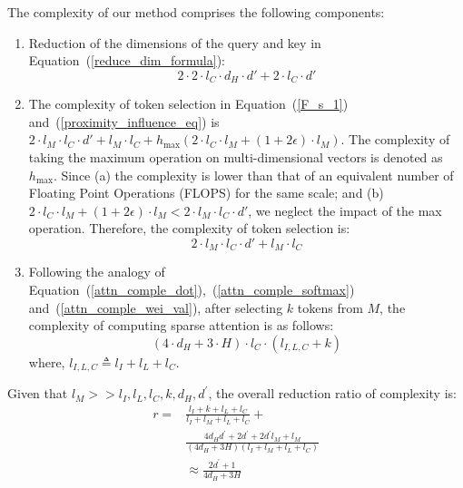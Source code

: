 The complexity of our method comprises the following components:
\begin{enumerate}
    \item Reduction of the dimensions of the query and key in Equation~(\ref{reduce_dim_formula}):
    \begin{equation}
      2 \cdot 2 \cdot l_C \cdot d_{H} \cdot d' + 2 \cdot l_C \cdot d'
    \end{equation}
    \item The complexity of token selection in Equation~(\ref{F_s_1}) and~(\ref{proximity_influence_eq}) is
    $2 \cdot l_M \cdot l_C \cdot d' + l_{M} \cdot l_C + h_{\text{max}}(2 \cdot l_C \cdot l_M + (1 + 2 \epsilon) \cdot l_M)$. The complexity of taking the maximum operation on multi-dimensional vectors is denoted as \( h_{\text{max}} \). Since (a) the complexity is lower than that of an equivalent number of Floating Point Operations (FLOPS)  for the same scale; and (b) $2 \cdot l_C \cdot l_M + (1 + 2 \epsilon) \cdot l_M < 2 \cdot l_M \cdot l_C \cdot d'$, we neglect the impact of the max operation. Therefore, the complexity of token selection is:
    \begin{equation}
      2 \cdot l_M \cdot l_C \cdot d' + l_{M} \cdot l_C
    \end{equation}
    \item Following the analogy of Equation~(\ref{attn_comple_dot}),~(\ref{attn_comple_softmax}) and~(\ref{attn_comple_wei_val}), after selecting $k$ tokens from $M$, the complexity of computing sparse attention is as follows:
    \begin{equation}
      (4 \cdot d_{H} + 3 \cdot H ) \cdot l_{C} \cdot (l_{I,L,C}+k)
    \end{equation}
    where, $l_{I,L,C} \triangleq l_{I}+l_{L}+l_{C}$.
\end{enumerate}
Given that $l_M >> l_{I},l_{L},l_{C},k,d_{H},d^{\prime}$, the overall reduction ratio of complexity is:
\begin{align} \label{reduction_ratio_complexity_infer}
r = &\frac{l_I + k + l_L + l_C}{l_I + l_M + l_L + l_C} + \nonumber \\
&\frac{4 d_{H} d^{\prime} + 2 d^{\prime} + 2 d^{\prime} l_M + l_M}{(4 d_{H} + 3H) (l_I + l_M + l_L + l_C)} \nonumber \\
&\approx \frac{2 d^{\prime} +1}{4d_{H} + 3H}
\end{align}
